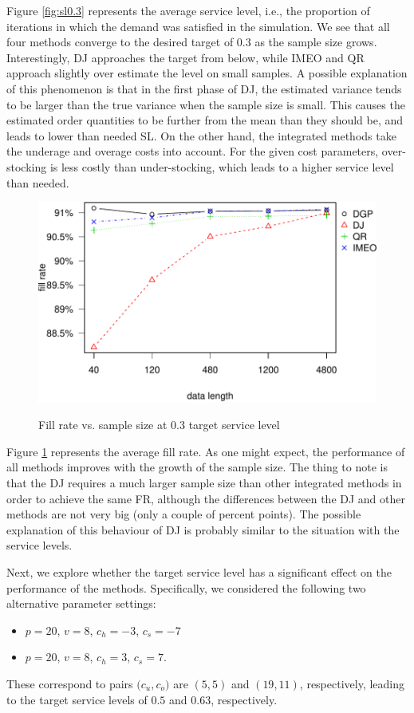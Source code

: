 \documentclass{article}
\begin{document}
Figure \ref{fig:sl0.3} represents the average service level, i.e., the proportion of iterations in which the demand was satisfied in the simulation. We see that all four methods converge to the desired target of 0.3 as the sample size grows. Interestingly, DJ approaches the target from below, while IMEO and QR approach slightly over estimate the level on small samples. A possible explanation of this phenomenon is that in the first phase of DJ, the estimated variance tends to be larger than the true variance when the sample size is small. This causes the estimated order quantities to be further from the mean than they should be, and leads to lower than needed SL. On the other hand, the integrated methods take the underage and overage costs into account. For the given cost parameters, over-stocking is less costly than under-stocking, which leads to a higher service level than needed.

\begin{figure}[ht]
\centering
\caption{Fill rate vs. sample size at 0.3 target service level}
\includegraphics{fr0.3.pdf}
\label{fig:fr0.3}
\end{figure}

Figure \ref{fig:fr0.3} represents the average fill rate. As one might expect, the performance of all methods improves with the growth of the sample size. The thing to note is that the DJ requires a much larger sample size than other integrated methods in order to achieve the same FR, although the differences between the DJ and other methods are not very big (only a couple of percent points). The possible explanation of this behaviour of DJ is probably similar to the situation with the service levels.

Next, we explore whether the target service level has a significant effect on the performance of the methods. Specifically, we considered the following two alternative parameter settings:
\begin{itemize}
    \item $p=20$, $v=8$, $c_h=-3$, $c_s=-7$
    \item $p=20$, $v=8$, $c_h=3$, $c_s=7$.
\end{itemize}
These correspond to pairs $\big( c_u,c_o \big)$ are $(5,5)$ and $(19,11)$, respectively, leading to the target service levels of $0.5$ and $0.63$, respectively.
\end{document}

